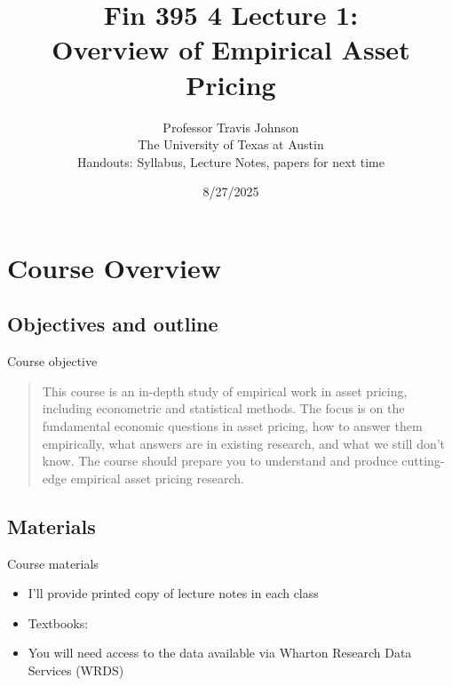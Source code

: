 \documentclass[xcolor=table, aspectratio=169]{beamer}
\title[Overview of Empirical Asset Pricing]{Fin 395 4 Lecture 1: \\ Overview of Empirical Asset Pricing}
\author[Empirical Asset Pricing (Johnson)]{Professor Travis Johnson \\ The University of Texas at Austin \vspace{10pt} \\ Handouts: Syllabus, Lecture Notes, papers for next time}
\date{8/27/2025}
\begin{document}
\begin{frame}
  \titlepage 
\end{frame}


\section{Course Overview}
\subsection{Objectives and outline}
\begin{frame}{Course objective}
\begin{quote}
This course is an in-depth study of empirical work in asset pricing, including econometric and statistical methods. The focus is on the fundamental economic questions in asset pricing, how to answer them empirically, what answers are in existing research, and what we still don't know. The course should prepare you to understand and produce cutting-edge empirical asset pricing research.
\end{quote}
\end{frame}

\subsection{Materials}
\begin{frame}{Course materials}
\begin{itemize}
\item I'll provide printed copy of lecture notes in each class
\item Textbooks: 
\begin{itemize}
\end{itemize}
\item You will need access to the data available via Wharton Research Data Services (WRDS)
\end{itemize}
\end{frame}
\end{document}
